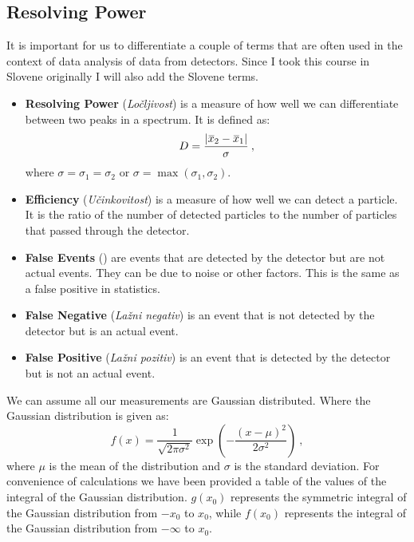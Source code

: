 \documentclass[10pt, titlepage, a4paper]{article}
\newcommand\thickbar[1]{\accentset{\rule{.5em}{.03em}}{#1}}
\renewcommand{\bar}{\thickbar}
\numberwithin{equation}{section}
\begin{document}
\subsection{Resolving Power}
It is important for us to differentiate a couple of terms that are often used in the context of data analysis of data from 
detectors. Since I took this course in Slovene originally I will also add the Slovene terms.
%
\begin{itemize}
    \item \textbf{Resolving Power} (\textit{Ločljivost}) is a measure of how well we can differentiate between two peaks
    in a spectrum. It is defined as:
    \begin{equation}
        D = \frac{|\bar{x}_2 - \bar{x}_1|}{\sigma}\>,
        \label{eq:resolving-power}
    \end{equation}
    where $\sigma = \sigma_1 = \sigma_2$ or $\sigma = \max{(\sigma_1, \sigma_2)}$.
    \item \textbf{Efficiency} (\textit{Učinkovitost}) is a measure of how well we can detect a particle. It is the ratio of the number of detected particles to the number of
    particles that passed through the detector.
    \item \textbf{False Events} () are events that are detected by the detector but are not actual
    events. They can be due to noise or other factors. This is the same as a false positive in statistics.
    \item \textbf{False Negative} (\textit{Lažni negativ}) is an event that is not detected by the detector but is an actual event.
    \item \textbf{False Positive} (\textit{Lažni pozitiv}) is an event that is detected by the detector but is not an actual event.
\end{itemize}
%
We can assume all our measurements are Gaussian distributed. Where the Gaussian distribution is given as:
%
\begin{equation}
    f(x) = \frac{1}{\sqrt{2\pi\sigma^2}}\exp{\left(-\frac{(x-\mu)^2}{2\sigma^2}\right)}\>,
    \label{eq:gaussian}
\end{equation}
%
where $\mu$ is the mean of the distribution and $\sigma$ is the standard deviation. For convenience of calculations we 
have been provided a table of the values of the integral of the Gaussian distribution. $g(x_0)$ represents the symmetric
integral of the Gaussian distribution from $-x_0$ to $x_0$, while $f(x_0)$ represents the integral of the Gaussian distribution
from $-\infty$ to $x_0$.
\end{document}
